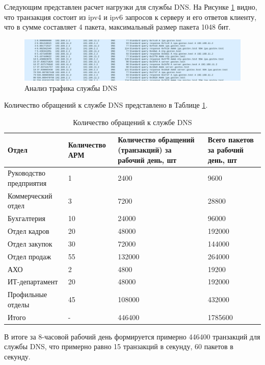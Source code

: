 \documentclass[14pt, a4paper]{extarticle}
\numberwithin{equation}{section}
\begin{document}
Следующим представлен расчет нагрузки для службы DNS. На Рисунке \ref{fig:wireshark_dns_dump} видно, что 
транзакция состоит из ipv4 и ipv6 запросов к серверу и его ответов клиенту, что в сумме составляет 4 пакета,
максимальный размер пакета 1048 бит.

\begin{figure}[H]
        \centering
        \includegraphics[scale=0.4]{dns_wireshark.png}
        \caption{Анализ трафика службы DNS}
        \label{fig:wireshark_dns_dump}
\end{figure}


Количество обращений к службе DNS представлено в Таблице \ref{table:dns_requests}.
\begin{table}[H]
\centering
\small
\caption{Количество обращений к службе DNS}
\label{table:dns_requests}
\begin{tabular}{|m{3cm}|m{3cm}|m{4cm}|m{3cm}|}
\hline
\textbf{Отдел} & \textbf{Количество АРМ} & \textbf{Количество обращений (транзакций) за рабочий день, шт } & \textbf{Всего пакетов за рабочий день, шт }\\
\hline
Руководство предприятия & 1 & 2400 & 9600 \\
\hline
Коммерческий отдел & 3 & 7200 & 28800 \\
\hline
Бухгалтерия & 10 & 24000 & 96000 \\
\hline
Отдел кадров & 20 & 48000 & 192000 \\
\hline
Отдел закупок & 30 & 72000 & 144000 \\
\hline
Отдел продаж & 55 & 132000 & 264000 \\
\hline
АХО & 2 & 4800 & 19200 \\
\hline
ИТ-департамент & 20 & 48000 & 192000 \\
\hline
Профильные отделы & 45 & 108000 & 432000 \\
\hline
Итого & - & 446400 & 1785600  \\
\hline
\end{tabular}
\end{table}

В итоге за 8-часовой рабочий день формируется примерно 446400 транзакций для 
службы DNS, что примерно равно 
15 транзакций в секунду, 60 пакетов в секунду.
\end{document}
